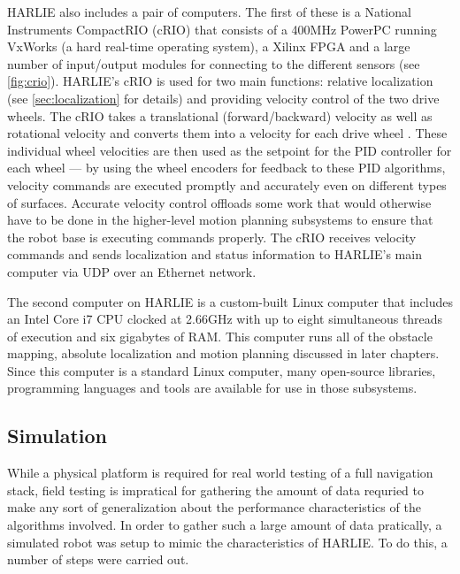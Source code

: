 HARLIE also includes a pair of computers. The first of these is a National Instruments CompactRIO (cRIO) that consists of a 400MHz PowerPC running VxWorks (a hard real-time operating system), a Xilinx FPGA and a large number of input/output modules for connecting to the different sensors  (see \autoref{fig:crio}). HARLIE's cRIO is used for two main functions: relative localization (see \autoref{sec:localization} for details) and providing velocity control of the two drive wheels. The cRIO takes a translational (forward/backward) velocity as well as rotational velocity and converts them into a velocity for each drive wheel . These individual wheel velocities are then used as the setpoint for the PID controller for each wheel --- by using the wheel encoders for feedback to these PID algorithms, velocity commands are executed promptly and accurately even on different types of surfaces. Accurate velocity control offloads some work that would otherwise have to be done in the higher-level motion planning subsystems to ensure that the robot base is executing commands properly. The cRIO receives velocity commands and sends localization and status information to HARLIE's main computer via UDP over an Ethernet network.

The second computer on HARLIE is a custom-built Linux computer that includes an Intel Core i7 CPU clocked at 2.66GHz with up to eight simultaneous threads of execution and six gigabytes of RAM. This computer runs all of the obstacle mapping, absolute localization and motion planning discussed in later chapters. Since this computer is a standard Linux computer, many open-source libraries, programming languages and tools are available for use in those subsystems.

\subsection{Simulation}\label{subsec:simulation_setup}

While a physical platform is required for real world testing of a full navigation stack, field testing is impratical for gathering the amount of data requried to make any sort of generalization about the performance characteristics of the algorithms involved. In order to gather such a large amount of data pratically, a simulated robot was setup to mimic the characteristics of HARLIE. To do this, a number of steps were carried out.

